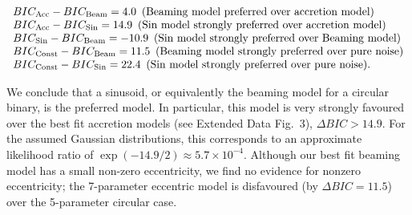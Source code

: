 \begin{center}
$\begin{array} {l l}
%
%
%
   BIC_{\rm Acc} - BIC_{\rm Beam} = 4.0 \,\,\, {\rm (Beaming~model~preferred~over~accretion~model)} \\  %
%
  BIC_{\rm Acc} - BIC_{\rm Sin} = 14.9 \,\,\, {\rm (Sin~model~strongly~preferred~over~accretion~model)} \\ %
%
  BIC_{\rm Sin} - BIC_{\rm Beam} = -10.9  \,\,\, {\rm (Sin~model~strongly~preferred~over~Beaming~model)}  \\ %
%
  BIC_{\rm Const} - BIC_{\rm Beam} = 11.5   \,\,\, {\rm (Beaming~model~strongly~preferred~over~pure~noise)} \\ %
  BIC_{\rm Const} - BIC_{\rm Sin} = 22.4 \,\,\, {\rm (Sin~model~strongly~preferred~over~pure~noise)}. %
\end{array}$
\end{center} 

We conclude that a sinusoid, or equivalently
the beaming model for a circular binary, is the preferred model.  In
particular, this model is very strongly favoured over the best fit
accretion models (see Extended Data Fig.~3), %
$\Delta BIC>14.9$. For the assumed Gaussian distributions, this
corresponds to an approximate likelihood ratio of
$\exp(-14.9/2)\approx 5.7\times 10^{-4}$.
Although our best fit beaming model has a small non-zero eccentricity, we find no evidence
for nonzero eccentricity; the 7-parameter eccentric model is
disfavoured (by $\Delta BIC=11.5$) over the 5-parameter circular case.

